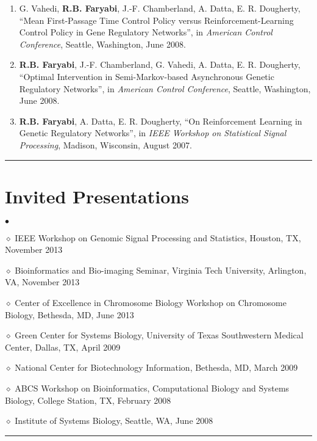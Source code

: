 \documentclass[12pt, centered, centered]{res_yy}
\newenvironment{list2}{
  \begin{list}{$\bullet$}{%
      \setlength{\itemsep}{0in}
      \setlength{\parsep}{0in} \setlength{\parskip}{0in}
      \setlength{\topsep}{0in} \setlength{\partopsep}{0in} 
      \setlength{\leftmargin}{0.2in}}}{\end{list}}
\begin{document}
\begin{resume}
\begin{enumerate}
\item G. Vahedi, {\bf {R.B. Faryabi}}, J.-F. Chamberland, A. Datta, E. R. Dougherty, 
``Mean First-Passage Time Control Policy versus Reinforcement-Learning Control Policy in Gene Regulatory Networks'',  in \emph{American Control Conference}, 
Seattle, Washington, June 2008.

\item {\bf {R.B. Faryabi}}, J.-F. Chamberland, G. Vahedi, A. Datta, E. R. Dougherty, 
``Optimal Intervention in Semi-Markov-based Asynchronous Genetic Regulatory Networks'',  
in \emph{American Control Conference}, Seattle, Washington, June 2008.

\item {\bf {R.B. Faryabi}}, A. Datta, E. R. Dougherty, 
``On Reinforcement Learning in Genetic Regulatory Networks'',  
in \emph{IEEE Workshop on Statistical Signal Processing}, 
Madison, Wisconsin, August 2007.
\end{enumerate}

\vspace{-.1in}
\rule{\linewidth}{0.05mm}

\section{\sc Invited Presentations}
\vspace{.2in}
\begin{list2}
\item[$\diamond$] IEEE Workshop on Genomic Signal Processing and Statistics, Houston, TX, November 2013
\item[$\diamond$] Bioinformatics and Bio-imaging Seminar, Virginia Tech University, Arlington, VA, November 2013
\item[$\diamond$] Center of Excellence in Chromosome Biology Workshop on Chromosome Biology, Bethesda, MD, June 2013
\item[$\diamond$] Green Center for Systems Biology, University of Texas Southwestern Medical Center, Dallas, TX, April 2009
\item[$\diamond$] National Center for Biotechnology Information, Bethesda, MD, March 2009
\item[$\diamond$] ABCS Workshop on Bioinformatics, Computational Biology and Systems Biology, College Station, TX, February 2008
\item[$\diamond$] Institute of Systems Biology, Seattle, WA, June 2008
\end{list2}
\vspace{-.1in}
\rule{\linewidth}{0.05mm}


\end{resume}
\end{document}
